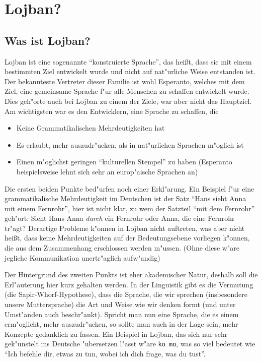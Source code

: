 \chapter{Lojban?}
\section{Was ist Lojban?}
Lojban ist eine sogenannte ``konstruierte Sprache'', das hei\ss{}t, dass sie mit einem bestimmten Ziel entwickelt wurde und nicht auf
nat"urliche Weise entstanden ist. Der bekannteste Vertreter dieser Familie ist wohl Esperanto, welches mit dem Ziel, eine gemeinsame Sprache
f"ur alle Menschen zu schaffen entwickelt wurde. Dies geh"orte auch bei Lojban zu einem der Ziele, war aber nicht das Hauptziel. Am wichtigsten
war es den Entwicklern, eine Sprache zu schaffen, die
\begin{itemize}
\item Keine Grammatikalischen Mehrdeutigkeiten hat
\item Es erlaubt, mehr auszudr"ucken, als in nat"urlichen Sprachen m"oglich ist
\item Einen m"oglichst geringen ``kulturellen Stempel'' zu haben (Esperanto beispielsweise lehnt sich sehr an europ"aische Sprachen an)
\end{itemize}

Die ersten beiden Punkte bed"urfen noch einer Erkl"arung.
Ein Beispiel f"ur eine grammatikalische Mehrdeutigkeit im Deutschen ist der Satz ``Hans sieht Anna mit einem Fernrohr'', hier ist nicht klar, zu
wem der Satzteil ``mit dem Fernrohr'' geh"ort: Sieht Hans Anna \emph{durch} ein Fernrohr oder Anna, die eine Fernrohr tr"agt?
Derartige Probleme k"onnen in Lojban nicht auftreten, was aber nicht hei\ss{}t, dass keine Mehrdeutigkeiten auf der Bedeutungsebene vorliegen
k"onnen, die aus dem Zusammenhang erschlossen werden m"ussen. (Ohne diese w"are jegliche Kommunikation unertr"aglich aufw"andig)

Der Hintergrund des zweiten Punkts ist eher akademischer Natur, deshalb soll die Erl"auterung hier kurz gehalten werden. In der Linguistik gibt
es die Vermutung (die Sapir-Whorf-Hypothese), dass die Sprache, die wir sprechen (insbesondere unsere Muttersprache) die Art und Weise wie wir
denken formt (und unter Umst"anden auch beschr"ankt). Spricht man nun eine Sprache, die es einem erm"oglicht, mehr auszudr"ucken, so sollte man
auch in der Lage sein, mehr Konzepte gedanklich zu fassen.
Ein Beispiel in Lojban, das sich nur sehr gek"unstelt ins Deutsche "ubersetzen l"asst w"are \texttt{ko mo}, was so viel bedeutet wie ``Ich
befehle dir, etwas zu tun, wobei ich dich frage, was du tust''.

